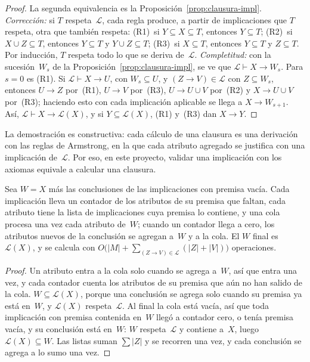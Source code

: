 \begin{proof}
La segunda equivalencia es la Proposición~\ref{prop:clausura-impl}. \emph{Corrección:} si $T$ respeta~$\mathcal{L}$, cada regla produce, a partir de implicaciones que $T$ respeta, otra que también respeta: (R1)~si $Y \subseteq X \subseteq T$, entonces $Y \subseteq T$; (R2)~si $X \cup Z \subseteq T$, entonces $Y \subseteq T$ y $Y \cup Z \subseteq T$; (R3)~si $X \subseteq T$, entonces $Y \subseteq T$ y $Z \subseteq T$. Por inducción, $T$ respeta todo lo que se deriva de~$\mathcal{L}$. \emph{Completitud:} con la sucesión~$W_s$ de la Proposición~\ref{prop:clausura-impl}, se ve que $\mathcal{L} \vdash X \to W_s$. Para $s = 0$ es (R1). Si $\mathcal{L} \vdash X \to U$, con $W_s \subseteq U$, y $(Z \to V) \in \mathcal{L}$ con $Z \subseteq W_s$, entonces $U \to Z$ por~(R1), $U \to V$ por~(R3), $U \to U \cup V$ por~(R2) y $X \to U \cup V$ por~(R3); haciendo esto con cada implicación aplicable se llega a $X \to W_{s+1}$. Así, $\mathcal{L} \vdash X \to \mathcal{L}(X)$, y si $Y \subseteq \mathcal{L}(X)$, (R1) y~(R3) dan $X \to Y$.
\end{proof}

La demostración es constructiva: cada cálculo de una clausura es una derivación con las reglas de Armstrong, en la que cada atributo agregado se justifica con una implicación de~$\mathcal{L}$. Por eso, en este proyecto, validar una implicación con los axiomas equivale a calcular una clausura.

\begin{teorema}\label{teo:linclosure}
Sea $W = X$ más las conclusiones de las implicaciones con premisa vacía. Cada implicación lleva un contador de los atributos de su premisa que faltan, cada atributo tiene la lista de implicaciones cuya premisa lo contiene, y una cola procesa una vez cada atributo de~$W$; cuando un contador llega a cero, los atributos nuevos de la conclusión se agregan a~$W$ y a la cola. El $W$ final es $\mathcal{L}(X)$, y se calcula con $O\bigl(\lvert M \rvert + \sum_{(Z \to V) \in \mathcal{L}} (\lvert Z \rvert + \lvert V \rvert)\bigr)$ operaciones.
\end{teorema}

\begin{proof}
Un atributo entra a la cola solo cuando se agrega a~$W$, así que entra una vez, y cada contador cuenta los atributos de su premisa que aún no han salido de la cola. $W \subseteq \mathcal{L}(X)$, porque una conclusión se agrega solo cuando su premisa ya está en~$W$, y $\mathcal{L}(X)$ respeta~$\mathcal{L}$. Al final la cola está vacía, así que toda implicación con premisa contenida en~$W$ llegó a contador cero, o tenía premisa vacía, y su conclusión está en~$W$: $W$ respeta~$\mathcal{L}$ y contiene a~$X$, luego $\mathcal{L}(X) \subseteq W$. Las listas suman $\sum \lvert Z \rvert$ y se recorren una vez, y cada conclusión se agrega a lo sumo una vez.
\end{proof}

